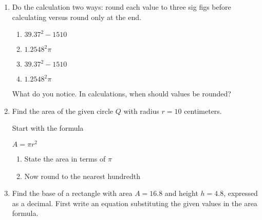\begin{enumerate}
\item Do the calculation two ways: round each value to three sig figs before calculating versus round only at the end.
  \begin{multicols}{2}
    \begin{enumerate}[itemsep=3cm]
      \item $39.37^2-1510$
      \item $1.2548^2 \pi$
      \item $39.37^2-1510$
      \item $1.2548^2 \pi$
    \end{enumerate}
  \end{multicols} \vspace{1cm}
  What do you notice. In calculations, when should values be rounded?



\newpage

\item Find the area of the given circle $Q$ with radius $r=10$ centimeters.
  \begin{multicols}{2}
  \raggedcolumns
  Start with the formula \par \medskip
  $A = \pi r^2$ 
  \begin{enumerate}
    \item State the area in terms of $\pi$ \vspace{1.7cm}
    \item Now round to the nearest hundredth
  \end{enumerate}
  \end{multicols}

\item Find the base of a rectangle with area $A=16.8$ and height $h=4.8$, expressed as a decimal. First write an equation substituting the given values in the area formula.
  \begin{flushright}
  \end{flushright}


\end{enumerate}
